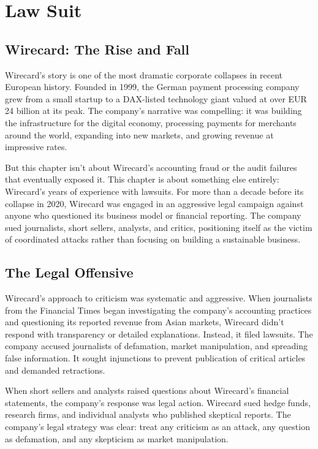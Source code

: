\chapter{Law Suit}

\section{Wirecard: The Rise and Fall}

Wirecard's story is one of the most dramatic corporate collapses in recent European history. Founded in 1999, the German payment processing company grew from a small startup to a DAX-listed technology giant valued at over EUR 24 billion at its peak. The company's narrative was compelling: it was building the infrastructure for the digital economy, processing payments for merchants around the world, expanding into new markets, and growing revenue at impressive rates.

But this chapter isn't about Wirecard's accounting fraud or the audit failures that eventually exposed it. This chapter is about something else entirely: Wirecard's years of experience with lawsuits. For more than a decade before its collapse in 2020, Wirecard was engaged in an aggressive legal campaign against anyone who questioned its business model or financial reporting. The company sued journalists, short sellers, analysts, and critics, positioning itself as the victim of coordinated attacks rather than focusing on building a sustainable business.

\section{The Legal Offensive}

Wirecard's approach to criticism was systematic and aggressive. When journalists from the Financial Times began investigating the company's accounting practices and questioning its reported revenue from Asian markets, Wirecard didn't respond with transparency or detailed explanations. Instead, it filed lawsuits. The company accused journalists of defamation, market manipulation, and spreading false information. It sought injunctions to prevent publication of critical articles and demanded retractions.

When short sellers and analysts raised questions about Wirecard's financial statements, the company's response was legal action. Wirecard sued hedge funds, research firms, and individual analysts who published skeptical reports. The company's legal strategy was clear: treat any criticism as an attack, any question as defamation, and any skepticism as market manipulation.

